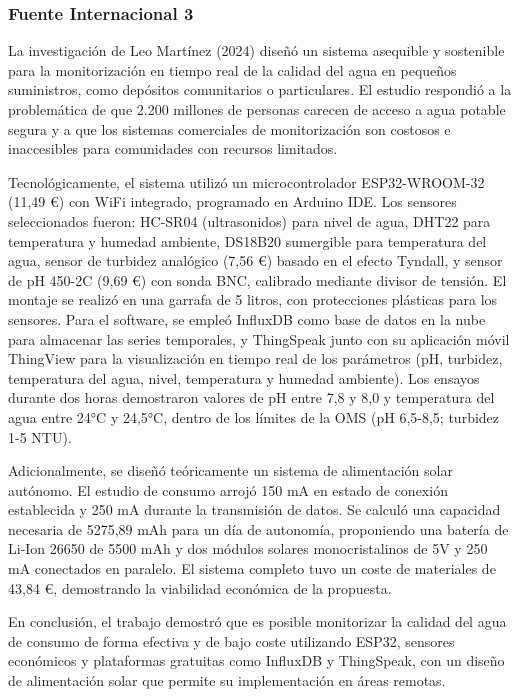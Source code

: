 \subsubsection{Fuente Internacional 3}

La investigación de Leo Martínez (2024) \cite{Leo2024} diseñó un sistema asequible y sostenible para la monitorización en tiempo real de la calidad del agua en pequeños suministros, como depósitos comunitarios o particulares. El estudio respondió a la problemática de que 2.200 millones de personas carecen de acceso a agua potable segura y a que los sistemas comerciales de monitorización son costosos e inaccesibles para comunidades con recursos limitados.

Tecnológicamente, el sistema utilizó un microcontrolador ESP32-WROOM-32 (11,49 €) con WiFi integrado, programado en Arduino IDE. Los sensores seleccionados fueron: HC-SR04 (ultrasonidos) para nivel de agua, DHT22 para temperatura y humedad ambiente, DS18B20 sumergible para temperatura del agua, sensor de turbidez analógico (7,56 €) basado en el efecto Tyndall, y sensor de pH 450-2C (9,69 €) con sonda BNC, calibrado mediante divisor de tensión. El montaje se realizó en una garrafa de 5 litros, con protecciones plásticas para los sensores. Para el software, se empleó InfluxDB como base de datos en la nube para almacenar las series temporales, y ThingSpeak junto con su aplicación móvil ThingView para la visualización en tiempo real de los parámetros (pH, turbidez, temperatura del agua, nivel, temperatura y humedad ambiente). Los ensayos durante dos horas demostraron valores de pH entre 7,8 y 8,0 y temperatura del agua entre 24°C y 24,5°C, dentro de los límites de la OMS (pH 6,5-8,5; turbidez 1-5 NTU).

Adicionalmente, se diseñó teóricamente un sistema de alimentación solar autónomo. El estudio de consumo arrojó 150 mA en estado de conexión establecida y 250 mA durante la transmisión de datos. Se calculó una capacidad necesaria de 5275,89 mAh para un día de autonomía, proponiendo una batería de Li-Ion 26650 de 5500 mAh y dos módulos solares monocristalinos de 5V y 250 mA conectados en paralelo. El sistema completo tuvo un coste de materiales de 43,84 €, demostrando la viabilidad económica de la propuesta.

En conclusión, el trabajo demostró que es posible monitorizar la calidad del agua de consumo de forma efectiva y de bajo coste utilizando ESP32, sensores económicos y plataformas gratuitas como InfluxDB y ThingSpeak, con un diseño de alimentación solar que permite su implementación en áreas remotas.

